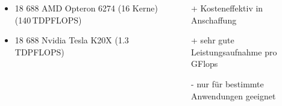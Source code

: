 \begin{frame}
\begin{columns}
    \begin{columns}
    \begin{itemize}{Aktueller (Juni 2016) Platz 3 Titan XK7 in der Top 500:}
        \item 18 688 AMD Opteron 6274 (16 Kerne) (140\,TDPFLOPS)
        \item 18 688 Nvidia Tesla K20X (1.3\,TDPFLOPS)  %
    \end{itemize}
    \begin{itemize}{General Purpose Graphical Processing Units(GPGPU) im Vergleich Prozessoren.}
        \item[+] Kosteneffektiv in Anschaffung
        \item[+] sehr gute Leistungsaufnahme pro GFlops
        \item[-] nur für bestimmte Anwendungen geeignet

\end{itemize}
\end{columns}
\end{columns}
\end{frame}
